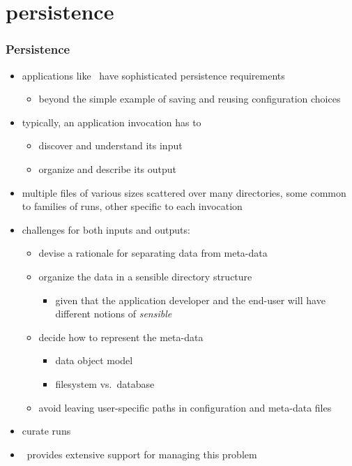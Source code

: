 %
%

\section{persistence}

\begin{frame}
%
  \frametitle{Persistence}
%
  \begin{itemize}
%
  \item applications like \isce\ have sophisticated persistence requirements
    \begin{itemize}
    \item beyond the simple example of saving and reusing configuration choices
    \end{itemize}
%
  \item typically, an application invocation has to
    \begin{itemize}
    \item discover and understand its input
    \item organize and describe its output
    \end{itemize}
%
  \item multiple files of various sizes scattered over many directories, some common to
    families of runs, other specific to each invocation
%
  \item challenges for both inputs and outputs:
    \begin{itemize}
    \item devise a rationale for separating data from meta-data
    \item organize the data in a sensible directory structure
      \begin{itemize}
      \item given that the application developer and the end-user will have different notions
        of \emph{sensible}
      \end{itemize}
    \item decide how to represent the meta-data
      \begin{itemize}
      \item data object model
      \item filesystem vs.~database
      \end{itemize}
    \item avoid leaving user-specific paths in configuration and meta-data files
    \end{itemize}
%
  \item curate runs
%
  \item \pyre\ provides extensive support for managing this problem
%
  \end{itemize}
%
\end{frame}

